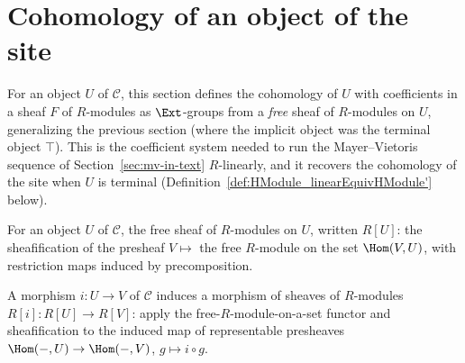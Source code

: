 \section{Cohomology of an object of the site}

For an object \(U\) of \(\mathcal C\), this section defines the cohomology of \(U\) with
coefficients in a sheaf \(F\) of \(R\)-modules as \(\Ext\)-groups from a \emph{free} sheaf
of \(R\)-modules on \(U\), generalizing the previous section (where the implicit object was
the terminal object \(\top\)). This is the coefficient system needed to run the
Mayer--Vietoris sequence of Section~\ref{sec:mv-in-text} \(R\)-linearly, and it recovers the
cohomology of the site when \(U\) is terminal (Definition~\ref{def:HModule_linearEquivHModule'}
below).

\begin{definition}
  \label{def:freeModuleSheaf}
  \leanok
  For an object \(U\) of \(\mathcal C\), the free sheaf of \(R\)-modules on \(U\), written
  \(R[U]\): the sheafification of the presheaf \(V \mapsto\) the free \(R\)-module on the
  set \(\Hom(V, U)\), with restriction maps induced by precomposition.
\end{definition}

\begin{definition}
  \label{def:freeModuleSheafMap}
  \leanok
  A morphism \(i : U \to V\) of \(\mathcal C\) induces a morphism of sheaves of
  \(R\)-modules \(R[i] : R[U] \to R[V]\): apply the free-\(R\)-module-on-a-set functor and
  sheafification to the induced map of representable presheaves
  \(\Hom(-,U) \to \Hom(-,V)\), \(g \mapsto i \circ g\).
\end{definition}

